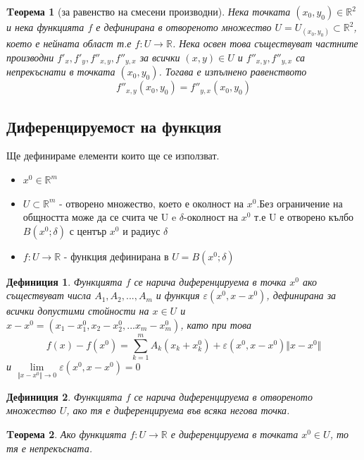 \documentclass[a4paper,fleqn,12pt]{article}
\newtheorem{theorem}{Tеорема}[subsection]
\newtheorem{definition}{Дефиниция}[subsection]
\theoremstyle{definition}
\begin{document}
\begin{theorem}[за равенство на смесени производни]
Нека точката $(x_0, y_0) \in \mathbb{R}^2$ и нека функцията $f$ е дефинирана в отвореното множество $U=U_{(x_0, y_0)} \subset \mathbb{R}^2$, което е нейната област т.е $f: U \to \mathbb{R}$. Нека освен това съществуват частните производни $f'_x, f'_y,f''_{x,y},f''_{y,x}$ за всички $(x, y)\in U$ и $f''_{x,y},f''_{y,x}$ са непрекъснати в точката $(x_0, y_0)$. Тогава е изпълнено равенството 
$$f''_{x,y}(x_0, y_0) = f''_{y,x}(x_0, y_0)$$
\end{theorem}

\subsection{Диференцируемост на функция}
Ще дефинираме елементи които ще се използват. 
\begin{itemize}
	\item $x^0 \in \mathbb{R}^m$
	\item $U \subset \mathbb{R}^m$ - отворено множество, което е околност на $x^0$.Без ограничение на общността може да се счита че U e $\delta$-околност на $x^0$ т.е U е отворено кълбо $B(x^0;\delta)$ с център $x^0$ и радиус $\delta$
	\item $f: U \to \mathbb{R}$ - функция дефинирана в $U = B(x^0;\delta) $
\end{itemize}

\begin{definition}
Функцията $f$ се нарича диференцируема в точка $x^0$ ако съществуват числа $A_1, A_2, ..., A_m$ и функция $\varepsilon (x^0, x - x^0)$, дефинирана за всички допустими стойности на $x \in U$ и $x - x^0 = (x_1 - x_1 ^0, x_2 - x_2 ^0,... x_m - x_m ^0)$, като при това 
$$f(x) - f(x^0) = \sum_{k=1}^{m} A_k(x_k + x_k ^ 0) + \varepsilon (x^0, x - x^0) \Vert x - x^0 \Vert$$ 
и $\lim\limits_{\Vert x - x^0 \Vert \to 0}\varepsilon (x^0, x - x^0) = 0$
\end{definition}

\begin{definition}
Функцията $f$ се нарича диференцируема в отвореното множество $U$, ако тя е диференцируема във всяка негова точка. 
\end{definition}

\begin{theorem}
Ако функцията $f: U \to \mathbb{R}$ е диференцируема в точката $x^0 \in U$, то тя е непрекъсната. 
\end{theorem}
\end{document}
